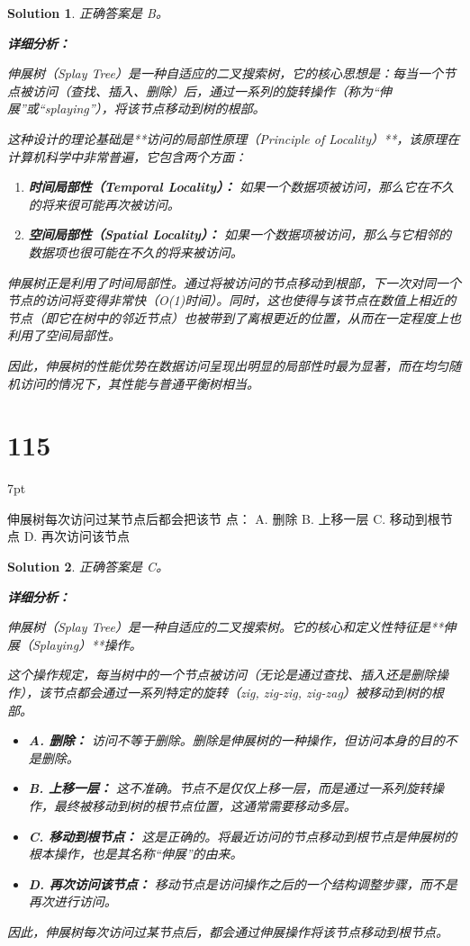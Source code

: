 \documentclass[UTF8]{report}
\newtheorem{solution}{Solution}
\theoremstyle{MyLineTheoremStyle} %
\theoremstyle{MyBlockTheoremStyle} %
\theoremstyle{MySubsubsectionStyle} %
\newenvironment{graybox}{%
        \def\FrameCommand{%
        \hspace{1pt}%
        {\color{gray}\small \vrule width 2pt}%
        {\color{graybox_color}\vrule width 4pt}%
        \colorbox{graybox_color}%
        }%
        \MakeFramed{\advance\hsize-\width\FrameRestore}%
        \noindent\hspace{-4.55pt}%
        \begin{adjustwidth}{}{7pt}%
        \vspace{2pt}\vspace{2pt}%
        }
        {%
        \vspace{2pt}\end{adjustwidth}\endMakeFramed%
        }
\begin{document}
\begin{solution}
正确答案是 B。

\textbf{详细分析：}

伸展树（Splay Tree）是一种自适应的二叉搜索树，它的核心思想是：每当一个节点被访问（查找、插入、删除）后，通过一系列的旋转操作（称为“伸展”或“splaying”），将该节点移动到树的根部。

这种设计的理论基础是**访问的局部性原理（Principle of Locality）**，该原理在计算机科学中非常普遍，它包含两个方面：
\begin{enumerate}
    \item \textbf{时间局部性（Temporal Locality）：} 如果一个数据项被访问，那么它在不久的将来很可能再次被访问。
    \item \textbf{空间局部性（Spatial Locality）：} 如果一个数据项被访问，那么与它相邻的数据项也很可能在不久的将来被访问。
\end{enumerate}

伸展树正是利用了时间局部性。通过将被访问的节点移动到根部，下一次对同一个节点的访问将变得非常快（O(1)时间）。同时，这也使得与该节点在数值上相近的节点（即它在树中的邻近节点）也被带到了离根更近的位置，从而在一定程度上也利用了空间局部性。

因此，伸展树的性能优势在数据访问呈现出明显的局部性时最为显著，而在均匀随机访问的情况下，其性能与普通平衡树相当。
\end{solution}


\section*{115}
\begin{graybox}
伸展树每次访问过某节点后都会把该节
点：
A. 删除
B. 上移一层
C. 移动到根节点
D. 再次访问该节点
\end{graybox}

\begin{solution}
正确答案是 C。

\textbf{详细分析：}

伸展树（Splay Tree）是一种自适应的二叉搜索树。它的核心和定义性特征是**伸展（Splaying）**操作。

这个操作规定，每当树中的一个节点被访问（无论是通过查找、插入还是删除操作），该节点都会通过一系列特定的旋转（zig, zig-zig, zig-zag）被移动到树的根部。

\begin{itemize}
    \item \textbf{A. 删除：} 访问不等于删除。删除是伸展树的一种操作，但访问本身的目的不是删除。
    \item \textbf{B. 上移一层：} 这不准确。节点不是仅仅上移一层，而是通过一系列旋转操作，最终被移动到树的根节点位置，这通常需要移动多层。
    \item \textbf{C. 移动到根节点：} 这是正确的。将最近访问的节点移动到根节点是伸展树的根本操作，也是其名称“伸展”的由来。
    \item \textbf{D. 再次访问该节点：} 移动节点是访问操作之后的一个结构调整步骤，而不是再次进行访问。
\end{itemize}

因此，伸展树每次访问过某节点后，都会通过伸展操作将该节点移动到根节点。
\end{solution}
\end{document}
